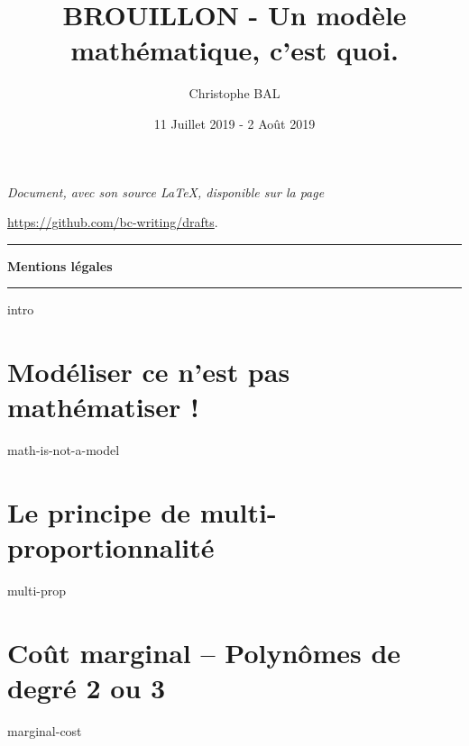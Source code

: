 \documentclass[12pt]{amsart}
\let\oldsection\section
\renewcommand\section[1]{\vfill\pagebreak\oldsection{#1}}
\begin{document}
\title{BROUILLON - Un modèle mathématique, c'est quoi.}
\author{Christophe BAL}
\date{11 Juillet 2019 - 2 Août 2019}


\maketitle

\begin{center}
	\itshape
	Document, avec son source \LaTeX, disponible sur la page
	
	\url{https://github.com/bc-writing/drafts}.
\end{center}


\bigskip


\begin{center}
	\hrule\vspace{.3em}
	{
		\fontsize{1.35em}{1em}\selectfont
		\textbf{Mentions \og légales \fg}
	}
			
	\vspace{0.45em}
	\doclicenseThis
	\hrule
\end{center}



\setcounter{tocdepth}{1}
\tableofcontents




{intro}





\section{Modéliser ce n'est pas mathématiser !}

{math-is-not-a-model}




\section{Le principe de \og multi-proportionnalité \fg}

{multi-prop}




\section{Coût marginal -- Polynômes de degré 2 ou 3}

{marginal-cost}
\end{document}
